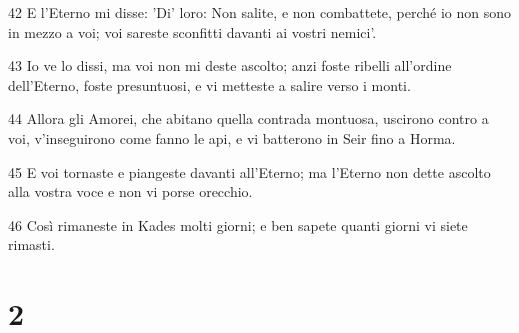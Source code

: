 \par 42 E l'Eterno mi disse: 'Di' loro: Non salite, e non combattete, perché io non sono in mezzo a voi; voi sareste sconfitti davanti ai vostri nemici'.
\par 43 Io ve lo dissi, ma voi non mi deste ascolto; anzi foste ribelli all'ordine dell'Eterno, foste presuntuosi, e vi metteste a salire verso i monti.
\par 44 Allora gli Amorei, che abitano quella contrada montuosa, uscirono contro a voi, v'inseguirono come fanno le api, e vi batterono in Seir fino a Horma.
\par 45 E voi tornaste e piangeste davanti all'Eterno; ma l'Eterno non dette ascolto alla vostra voce e non vi porse orecchio.
\par 46 Così rimaneste in Kades molti giorni; e ben sapete quanti giorni vi siete rimasti.

\chapter{2}

